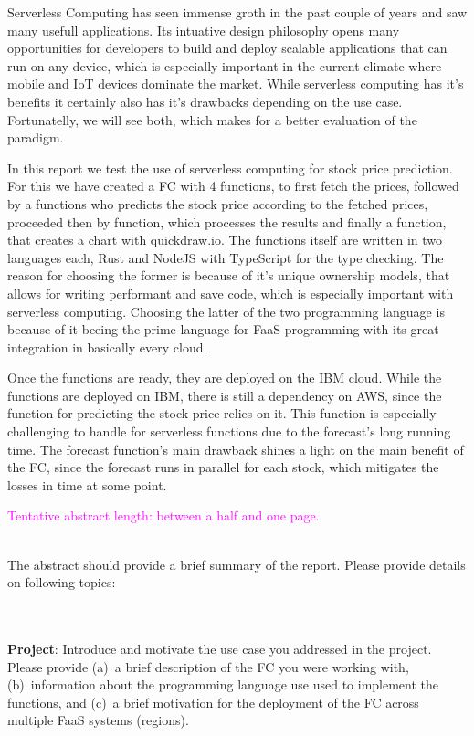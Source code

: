 \noindent

Serverless Computing has seen immense groth in the past couple of years and saw
many usefull applications. Its intuative design philosophy opens many
opportunities for developers to build and deploy scalable applications that can
run on any device, which is especially important in the current climate where
mobile and IoT devices dominate the market. While serverless computing has it's
benefits it certainly also has it's drawbacks depending on the use case.
Fortunatelly, we will see both, which makes for a better evaluation of the
paradigm.

In this report we test the use of serverless computing for stock price
prediction. For this we have created a FC with 4 functions, to first fetch the
prices, followed by a functions who predicts the stock price according to the
fetched prices, proceeded then by function, which processes the results and
finally a function, that creates a chart with quickdraw.io. The functions
itself are written in two languages each, Rust and NodeJS with TypeScript for
the type checking. The reason for choosing the former is because of it's unique
ownership models, that allows for writing performant and save code, which is
especially important with serverless computing. Choosing the latter of the two
programming language is because of it beeing the prime language for FaaS
programming with its great integration in basically every cloud.

Once the functions are ready, they are deployed on the IBM cloud. While the
functions are deployed on IBM, there is still a dependency on AWS, since the
function for predicting the stock price relies on it. This function is
especially challenging to handle for serverless functions due to the forecast's
long running time. The forecast function's main drawback shines a light on the
main benefit of the FC, since the forecast runs in parallel for each stock,
which mitigates the losses in time at some point.

\textcolor{magenta}{Tentative abstract length: between a half and one page.}

\vspace{20 pt}

\\The abstract should provide a brief summary of the report. Please provide details on following topics:

\\\\\textbf{Project}:
Introduce and motivate the use case you addressed in the project.
Please provide (a)~a brief description of the FC you were working with, (b)~information about the programming language use used to implement the functions, and (c)~a brief motivation for the deployment of the FC across multiple FaaS systems (regions).

